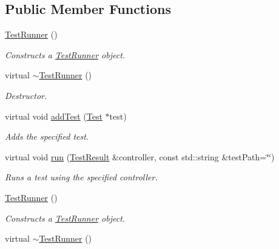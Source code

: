 \subsection*{Public Member Functions}
\begin{DoxyCompactItemize}
\item 
\hypertarget{class_test_runner_adf6d073e739128299841d29a6701d34b}{\hyperlink{class_test_runner_adf6d073e739128299841d29a6701d34b}{Test\+Runner} ()}\label{class_test_runner_adf6d073e739128299841d29a6701d34b}

\begin{DoxyCompactList}\small\item\em Constructs a \hyperlink{class_test_runner}{Test\+Runner} object. \end{DoxyCompactList}\item 
\hypertarget{class_test_runner_a121456d7e522c0d83d648a0118ec0c6f}{virtual \hyperlink{class_test_runner_a121456d7e522c0d83d648a0118ec0c6f}{$\sim$\+Test\+Runner} ()}\label{class_test_runner_a121456d7e522c0d83d648a0118ec0c6f}

\begin{DoxyCompactList}\small\item\em Destructor. \end{DoxyCompactList}\item 
virtual void \hyperlink{class_test_runner_aa286601c0ef9569da0fbec0cfb898e94}{add\+Test} (\hyperlink{class_test}{Test} $\ast$test)
\begin{DoxyCompactList}\small\item\em Adds the specified test. \end{DoxyCompactList}\item 
virtual void \hyperlink{class_test_runner_a8b00872cb370423de5e4a2520ff4f407}{run} (\hyperlink{class_test_result}{Test\+Result} \&controller, const std\+::string \&test\+Path=\char`\"{}\char`\"{})
\begin{DoxyCompactList}\small\item\em Runs a test using the specified controller. \end{DoxyCompactList}\item 
\hypertarget{class_test_runner_adf6d073e739128299841d29a6701d34b}{\hyperlink{class_test_runner_adf6d073e739128299841d29a6701d34b}{Test\+Runner} ()}\label{class_test_runner_adf6d073e739128299841d29a6701d34b}

\begin{DoxyCompactList}\small\item\em Constructs a \hyperlink{class_test_runner}{Test\+Runner} object. \end{DoxyCompactList}\item 
\hypertarget{class_test_runner_a29e222f91f622ee3f1c2b7c1317770c7}{virtual \hyperlink{class_test_runner_a29e222f91f622ee3f1c2b7c1317770c7}{$\sim$\+Test\+Runner} ()}\label{class_test_runner_a29e222f91f622ee3f1c2b7c1317770c7}


\end{DoxyCompactItemize}
